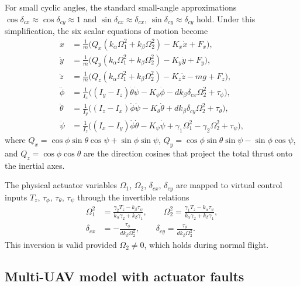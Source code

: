 For small cyclic angles, the standard small-angle approximations
$\cos\delta_{cx} \approx \cos\delta_{cy} \approx 1$ and
$\sin\delta_{cx} \approx \delta_{cx}$, $\sin\delta_{cy} \approx \delta_{cy}$ hold.
Under this simplification, the six scalar equations of motion become
\begin{align}
\ddot{x} &= \frac{1}{m}\Big(Q_x(k_\alpha\Omega_1^2 + k_\beta\Omega_2^2) - K_x\dot{x} + F_x\Big), \label{eq:ddx}\\
\ddot{y} &= \frac{1}{m}\Big(Q_y(k_\alpha\Omega_1^2 + k_\beta\Omega_2^2) - K_y\dot{y} + F_y\Big), \label{eq:ddy}\\
\ddot{z} &= \frac{1}{m}\Big(Q_z(k_\alpha\Omega_1^2 + k_\beta\Omega_2^2) - K_z\dot{z} - mg + F_z\Big), \label{eq:ddz}\\
\ddot{\phi}   &= \frac{1}{I_x}\Big((I_y-I_z)\dot{\theta}\dot{\psi} - K_\phi\dot{\phi} - dk_\beta\delta_{cx}\Omega_2^2 + \tau_\phi\Big), \label{eq:ddphi}\\
\ddot{\theta} &= \frac{1}{I_y}\Big((I_z-I_x)\dot{\phi}\dot{\psi}  - K_\theta\dot{\theta} + dk_\beta\delta_{cy}\Omega_2^2 + \tau_\theta\Big), \label{eq:ddtheta}\\
\ddot{\psi}   &= \frac{1}{I_z}\Big((I_x-I_y)\dot{\phi}\dot{\theta} - K_\psi\dot{\psi} + \gamma_1\Omega_1^2 - \gamma_2\Omega_2^2 + \tau_\psi\Big), \label{eq:ddpsi}
\end{align}
where $Q_x = \cos\phi\sin\theta\cos\psi + \sin\phi\sin\psi$,
$Q_y = \cos\phi\sin\theta\sin\psi - \sin\phi\cos\psi$, and
$Q_z = \cos\phi\cos\theta$ are the direction cosines that project the total thrust
onto the inertial axes.

The physical actuator variables $\Omega_1$, $\Omega_2$, $\delta_{cx}$, $\delta_{cy}$
are mapped to virtual control inputs $T_z$, $\tau_\phi$, $\tau_\theta$, $\tau_\psi$
through the invertible relations
\begin{align}
\Omega_1^2 &= \frac{\gamma_2 T_z - k_\beta\tau_\psi}{k_\alpha\gamma_2 + k_\beta\gamma_1}, \qquad
\Omega_2^2  = \frac{\gamma_1 T_z - k_\alpha\tau_\psi}{k_\alpha\gamma_2 + k_\beta\gamma_1}, \label{eq:omega}\\
\delta_{cx} &= -\frac{\tau_\phi}{dk_\beta\Omega_2^2}, \qquad
\delta_{cy}  = \frac{\tau_\theta}{dk_\beta\Omega_2^2}. \label{eq:delta}
\end{align}
This inversion is valid provided $\Omega_2 \neq 0$, which holds during normal flight.

\subsection*{Multi-UAV model with actuator faults}

